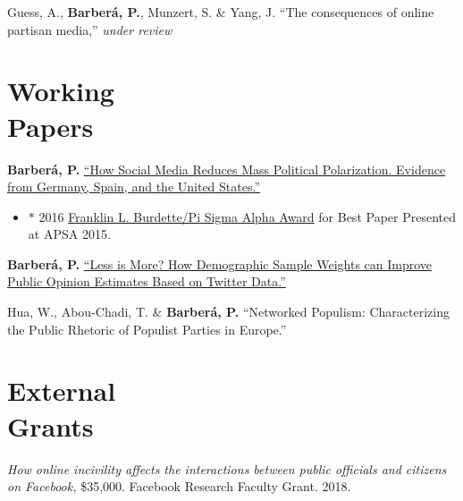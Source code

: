 \documentclass[margin,line,11pt]{resume}
\begin{document}
\begin{resume}
Guess, A., \textbf{Barber\'{a}, P.}, Munzert, S. \& Yang, J. ``The consequences of online partisan media,'' \textit{under review}

    \section{\mysidestyle Working\\Papers} 

\textbf{Barber\'{a}, P.} \href{http://www.pablobarbera.com/static/barbera_polarization_APSA.pdf}{``How Social Media Reduces Mass Political Polarization. Evidence from Germany, Spain, and the United States.''} 
\begin{itemize}
\item[] $\ast$ 2016 \href{http://www.apsanet.org/PROGRAMS/APSA-Awards/Franklin-L-Burdette-Pi-Sigma-Alpha-Award}{Franklin L. Burdette/Pi Sigma Alpha Award} for Best Paper Presented at APSA 2015.
\end{itemize}  

\textbf{Barber\'{a}, P.} \href{http://pablobarbera.com/static/less-is-more.pdf}{``Less is More? How Demographic Sample Weights can Improve Public Opinion Estimates Based on Twitter Data.''}


Hua, W., Abou-Chadi, T. \& \textbf{Barber\'{a}, P.} ``Networked Populism: Characterizing the Public Rhetoric of
Populist Parties in Europe.''






        \section{\mysidestyle External \\ Grants}
        
\textit{How online incivility affects the interactions between public officials and citizens on Facebook,} \$35,000. Facebook Research Faculty Grant. 2018.        
        

\end{resume}
\end{document}
